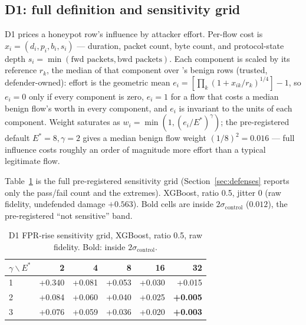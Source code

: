 \subsection{D1: full definition and sensitivity grid}
D1 prices a honeypot row's influence by attacker effort. Per-flow cost is
$x_i = (d_i, p_i, b_i, s_i)$ — duration, packet count, byte count, and protocol-state depth
$s_i = \min(\text{fwd packets}, \text{bwd packets})$. Each component is scaled by its reference
$r_k$, the median of that component over 's benign rows (trusted, defender-owned):
effort is the geometric mean $e_i = \left[\prod_k \left(1 + x_{ik}/r_k\right)^{1/4}\right] - 1$,
so $e_i=0$ only if every
component is zero, $e_i=1$ for a flow that costs a median benign flow's worth in every component,
and $e_i$ is invariant to the units of each component. Weight saturates as
$w_i = \min(1, (e_i/E^*)^\gamma)$; the pre-registered default $E^*=8,\gamma=2$ gives a median
benign flow weight $(1/8)^2 = 0.016$ — full influence costs roughly an order of magnitude more
effort than a typical legitimate flow.

Table~\ref{tab:d1-grid} is the full pre-registered sensitivity grid (Section~\ref{sec:defenses}
reports only the pass/fail count and the extremes). XGBoost, ratio 0.5, jitter 0 (raw fidelity,
undefended damage $+0.563$). Bold cells are inside $2\sigma_{\text{control}}$ ($0.012$), the
pre-registered “not sensitive” band.

\begin{table}[t]
  \centering
  \caption{D1 FPR-rise sensitivity grid, XGBoost, ratio 0.5, raw fidelity. Bold: inside
  $2\sigma_{\text{control}}$.}
  \label{tab:d1-grid}
  \small
  \begin{tabular}{lrrrrr}
    \toprule
    $\gamma \backslash E^*$ & 2 & 4 & 8 & 16 & 32 \\
    \midrule
    1 & +0.340 & +0.081 & +0.053 & +0.030 & +0.015 \\
    2 & +0.084 & +0.060 & +0.040 & +0.025 & \textbf{+0.005} \\
    3 & +0.076 & +0.059 & +0.036 & +0.020 & \textbf{+0.003} \\
    \bottomrule
  \end{tabular}
\end{table}

